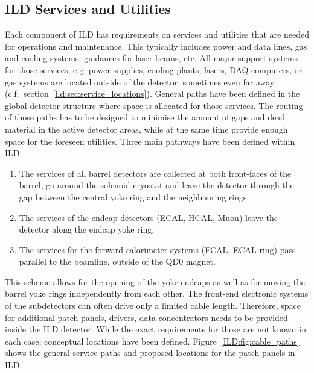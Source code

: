 \subsection{ILD Services and Utilities}
\label{ild:sec:services}
Each component of ILD has requirements on services and utilities that are needed for operations and maintenance. This typically includes power and data lines, gas and cooling systems, guidances for laser beams, etc. All major support systems for those services, e.g. power supplies, cooling plants, lasers, DAQ computers, or gas systems are located outside of the detector, sometimes even far away (c.f.~section~\ref{ild:sec:service_locations}). General paths have been defined in the global detector structure where space is allocated for those services. The routing of those paths has to be designed to minimise the amount of gaps and dead material in the active detector areas, while at the same time provide enough space for the foreseen utilities. Three main pathways have been defined within ILD:
\begin{enumerate}
    \item The services of all barrel detectors are collected at both front-faces of the barrel, go around the solenoid cryostat and leave the detector through the gap between the central yoke ring and the neighbouring rings.
    \item The services of the endcap detectors (ECAL, HCAL, Muon) leave the detector along the endcap yoke ring.
    \item The services for the forward calorimeter systems (FCAL, ECAL ring) pass parallel to the beamline, outside of the QD0 magnet.
\end{enumerate}

This scheme allows for the opening of the yoke endcaps as well as for moving the barrel yoke rings independently from each other. The front-end electronic systems of the subdetectors can often drive only a limited cable length. Therefore, space for additional patch panels, drivers, data concentrators needs to be provided inside the ILD detector. While the exact requirements for those are not known in each case, conceptual locations have been defined. Figure~\ref{ILD:fig:cable_paths} shows the general service paths and proposed locations for the patch panels in ILD.

